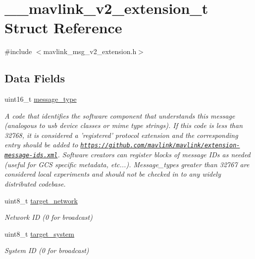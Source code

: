 \hypertarget{struct____mavlink__v2__extension__t}{\section{\+\_\+\+\_\+mavlink\+\_\+v2\+\_\+extension\+\_\+t Struct Reference}
\label{struct____mavlink__v2__extension__t}
}


{\ttfamily \#include $<$mavlink\+\_\+msg\+\_\+v2\+\_\+extension.\+h$>$}

\subsection*{Data Fields}
\begin{DoxyCompactItemize}
\item 
uint16\+\_\+t \hyperlink{struct____mavlink__v2__extension__t_a21e0487c9ef33e2a805e6d4f913bd93f}{message\+\_\+type}
\begin{DoxyCompactList}\small\item\em A code that identifies the software component that understands this message (analogous to usb device classes or mime type strings). If this code is less than 32768, it is considered a 'registered' protocol extension and the corresponding entry should be added to \href{https://github.com/mavlink/mavlink/extension-message-ids.xml}{\tt https\+://github.\+com/mavlink/mavlink/extension-\/message-\/ids.\+xml}. Software creators can register blocks of message I\+Ds as needed (useful for G\+C\+S specific metadata, etc...). Message\+\_\+types greater than 32767 are considered local experiments and should not be checked in to any widely distributed codebase. \end{DoxyCompactList}\item 
uint8\+\_\+t \hyperlink{struct____mavlink__v2__extension__t_ac1707b863fecd59b2f464b16d3f16744}{target\+\_\+network}
\begin{DoxyCompactList}\small\item\em Network I\+D (0 for broadcast) \end{DoxyCompactList}\item 
uint8\+\_\+t \hyperlink{struct____mavlink__v2__extension__t_acc69c4f849b8bbe37f49400b20835100}{target\+\_\+system}
\begin{DoxyCompactList}\small\item\em System I\+D (0 for broadcast) \end{DoxyCompactList}\item 

\end{DoxyCompactItemize}
